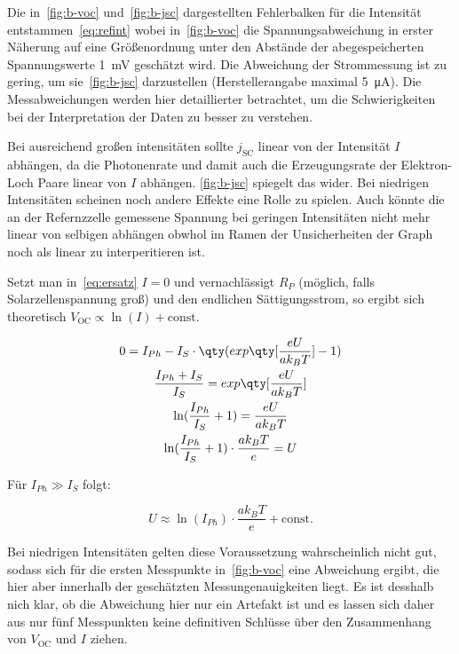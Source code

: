 \documentclass[slug=SZ, room=Hermann-Krone-Bau\,\ Labor\ 1.25,
supervisor=Martin\ Kroll, coursedate=14.\ 11.\ 2019]{../../Lab_Report_LaTeX/lab_report}
\newcommand{\voc}{V_{\text{OC}}}
\newcommand{\jsc}{j_{\text{SC}}}
\begin{document}
Die in~\ref{fig:b-voc} und~\ref{fig:b-jsc} dargestellten Fehlerbalken
f\"ur die Intensit\"at entstammen~\ref{eq:refint} wobei
in~\ref{fig:b-voc} die Spannungsabweichung in erster N\"aherung auf
eine Gr\"o\ss{}enordnung unter den Abst\"ande der abegespeicherten
Spannungswerte \SI{1}{\milli\volt} gesch\"atzt wird. Die Abweichung
der Strommessung ist zu gering, um sie~\ref{fig:b-jsc} darzustellen
(Herstellerangabe maximal \SI{5}{\micro\ampere}). Die Messabweichungen
werden hier detaillierter betrachtet, um die Schwierigkeiten bei der
Interpretation der Daten zu besser zu verstehen.

Bei ausreichend gro\ss{}en intensit\"aten sollte \(\jsc\) linear von
der Intensit\"at \(I\) abh\"angen, da die Photonenrate und damit auch
die Erzeugungsrate der Elektron-Loch Paare linear von \(I\)
abh\"angen. \ref{fig:b-jsc} spiegelt das wider. Bei niedrigen
Intensit\"aten scheinen noch andere Effekte eine Rolle zu
spielen. Auch k\"onnte die an der Refernzzelle gemessene Spannung bei
geringen Intensit\"aten nicht mehr linear von selbigen abh\"angen
obwhol im Ramen der Unsicherheiten der Graph noch als linear zu
interperitieren ist.

Setzt man in~\ref{eq:ersatz} \(I=0\) und vernachl\"assigt \(R_P\)
(m\"oglich, falls Solarzellenspannung gro\ss{}) und den endlichen
S\"attigungsstrom, so ergibt sich theoretisch
\(\voc\propto\ln(I) + \text{const}\).

\begin{gather}
0  = I_{Ph} - I_S \cdot \qty(exp\qty[\frac{eU}{ak_BT}]-1)\\
\frac{I_{Ph}+I_S}{I_S} = exp\qty[\frac{eU}{ak_BT}]\\
\ln(\frac{I_{Ph}}{I_S}+1) = \frac{eU}{ak_BT}\\
\ln(\frac{I_{Ph}}{I_S}+1) \cdot \frac{ak_BT}{e} = U \label{eq:shocknachu}
\end{gather}

Für \(I_{Ph} \gg I_S\) folgt:

\begin{equation}\label{eq:iphgross}
          U \approx \ln(I_{Ph}) \cdot \frac{ak_BT}{e} + \text{const.}
\end{equation}

Bei niedrigen Intensit\"aten gelten diese Voraussetzung wahrscheinlich
nicht gut, sodass sich f\"ur die ersten Messpunkte in~\ref{fig:b-voc}
eine Abweichung ergibt, die hier aber innerhalb der gesch\"atzten
Messungenauigkeiten liegt. Es ist desshalb nich klar, ob die
Abweichung hier nur ein Artefakt ist und es lassen sich daher aus nur
f\"unf Messpunkten keine definitiven Schl\"usse \"uber den
Zusammenhang von \(\voc\) und \(I\) ziehen.
\end{document}
